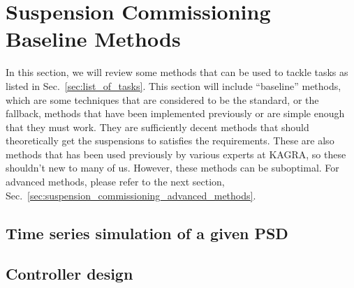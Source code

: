 \section{Suspension Commissioning Baseline Methods \label{sec:suspension_commissioning_baseline_methods}}
In this section, we will review some methods that can be used to tackle tasks as listed in Sec.~\ref{sec:list_of_tasks}.
This section will include ``baseline'' methods, which are some techniques that are considered to be the standard, or the fallback, methods that have been implemented previously or are simple enough that they must work.
They are sufficiently decent methods that should theoretically get the suspensions to satisfies the requirements.
These are also methods that has been used previously by various experts at KAGRA, so these shouldn't new to many of us.
However, these methods can be suboptimal.
For advanced methods, please refer to the next section, Sec.~\ref{sec:suspension_commissioning_advanced_methods}.








\subsection{Time series simulation of a given PSD}
\subsection{Controller design}

